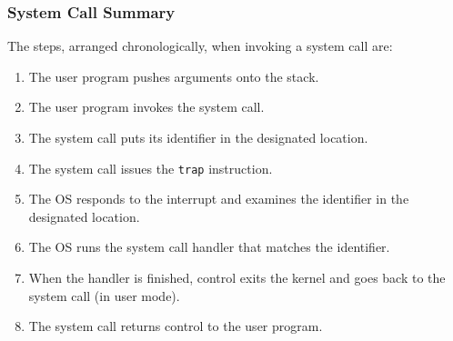 \begin{frame}
\frametitle{System Call Summary}

The steps, arranged chronologically, when invoking a system call are:
\begin{enumerate}
	\item The user program pushes arguments onto the stack.
	\item The user program invokes the system call.
	\item The system call puts its identifier in the designated location.
	\item The system call issues the \texttt{trap} instruction.
	\item The OS responds to the interrupt and examines the identifier in the designated location.
	\item The OS runs the system call handler that matches the identifier.
	\item When the handler is finished, control exits the kernel and goes back to the system call (in user mode).
	\item The system call returns control to the user program.

\end{enumerate}


\end{frame}







